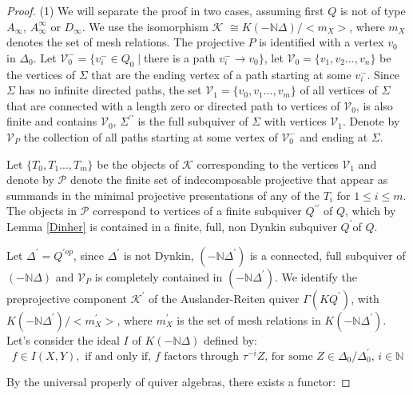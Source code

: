 \documentclass{amsart}
\theoremstyle{plain}
\numberwithin{equation}{section}
\begin{document}
\begin{proof}
(1) We will separate the proof in two cases, assuming first $Q$ is not of
type $A_{\infty }$, $A_{\infty }^{\infty }$ or $D_{\infty }$. We use the
isomorphism $\mathcal{K}$ $\cong K(-\mathbb{N}\Delta )/<m_{X}>$, where $m_{X} $ denotes the set of mesh relations. The projective $P$ is identified
with a vertex $v_{0}$ in $\Delta _{0}$. Let $\mathcal{V}_{0}^{-}=\{v_{i}^{-}\in Q_{0}\mid $there is a path $v_{i}^{-}\rightarrow v_{0}\}$, let $\mathcal{V}_{0}=\{v_{1},v_{2}...,v_{n}\}$ be the vertices of $\Sigma $ that are the
ending vertex of a path starting at some $v_{i}^{-}$. Since $\Sigma $ has no
infinite directed paths, the set $\mathcal{V}_{1}=\{v_{0},v_{1}...,v_{m}\}$
of all vertices of $\Sigma $ that are connected with a length zero or
directed path to vertices of $\mathcal{V}_{0}$, is also finite and contains $\mathcal{V}_{0}$, $\Sigma ^{\prime \prime }$ is the full subquiver of $\Sigma $ with vertices $\mathcal{V}_{1}$. Denote by $\mathcal{V}_{P}$ the
collection of all paths starting at some vertex of $\mathcal{V}_{0}^{-}$ and
ending at $\Sigma $.

Let $\{T_{0},T_{1}...,T_{m}\}$ be the objects of $\mathcal{K}$ corresponding
to the vertices $\mathcal{V}_{1}$ and denote by $\mathcal{P}$ denote the
finite set of indecomposable projective that appear as summands in the
minimal projective presentations of any of the $T_{i}$ for $1\leq i\leq m$.
The objects in $\mathcal{P}$ correspond to vertices of a finite subquiver $Q^{\prime \prime }$ of $Q$, which by Lemma \ref{Dinher} is contained in a
finite, full, non Dynkin subquiver $Q^{\prime }$of $Q$.

Let $\Delta ^{\prime }=Q^{\prime op}$, since $\Delta ^{\prime }$ is not
Dynkin, $(-\mathbb{N}\Delta ^{\prime })$ is a connected, full subquiver of $(-\mathbb{N}\Delta )$ and $\mathcal{V}_{P}$ is completely contained in $(-\mathbb{N}\Delta ^{\prime })$. We identify the preprojective component $\mathcal{K}^{\prime }$ of the Auslander-Reiten quiver $\Gamma (KQ^{\prime })$, with $K(-\mathbb{N}\Delta ^{\prime })/<m_{X}^{\prime }>$, where $m_{X}^{\prime }$ is the set of mesh relations in $K(-\mathbb{N}\Delta
^{\prime })$. Let's consider the ideal $I$ of $K(-\mathbb{N}\Delta )$
defined by:
\begin{equation*}
f\in I(X,Y),\text{ if and only if, $f$ factors through $\tau ^{-i}Z$, for
some $Z\in \Delta _{0}/\Delta _{0}^{\prime }$, $i\in \mathbb{N}$}
\end{equation*}

By the universal properly of quiver algebras, there exists a functor:


\end{proof}
\end{document}
